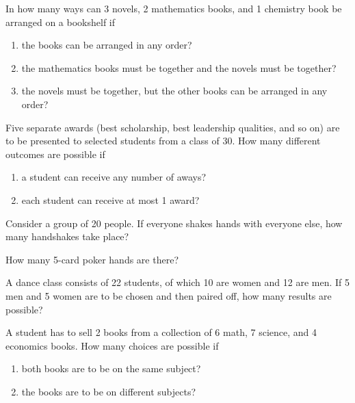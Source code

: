 \documentclass[12pt]{article}
\newenvironment{problem}[2][Problem]{\begin{trivlist}
\item[\hskip \labelsep {\bfseries #1}\hskip \labelsep {\bfseries #2.}]}{\end{trivlist}}
\begin{document}
\begin{problem}{1.11}
In how many ways can 3 novels, 2 mathematics books, and 1 chemistry book be arranged on a bookshelf if
\begin{enumerate}[label=(\alph*)]
	\item the books can be arranged in any order?
	\item the mathematics books must be together and the novels must be together?
	\item the novels must be together, but the other books can be arranged in any order?
\end{enumerate}
\end{problem}


\begin{problem}{1.12}
Five separate awards (best scholarship, best leadership qualities, and so on) are to be presented to selected students from a class of 30. How many different outcomes are possible if
\begin{enumerate}[label=(\alph*)]
	\item a student can receive any number of aways?
	\item each student can receive at most 1 award?
\end{enumerate}
\end{problem}

\begin{problem}{1.13}
Consider a group of 20 people. If everyone shakes hands with everyone else, how many handshakes take place?
\end{problem}


\begin{problem}{1.14}
How many 5-card poker hands are there?
\end{problem}


\begin{problem}{1.15}
A dance class consists of 22 students, of which 10 are women and 12 are men. If 5 men and 5 women are to be chosen and then paired off, how many results are possible?
\end{problem}


\begin{problem}{1.16}
A student has to sell 2 books from a collection of 6 math, 7 science, and 4 economics books. How many choices are possible if
\begin{enumerate}[label=(\alph*)]
	\item both books are to be on the same subject?
	\item the books are to be on different subjects?
\end{enumerate}
\end{problem}
\end{document}
